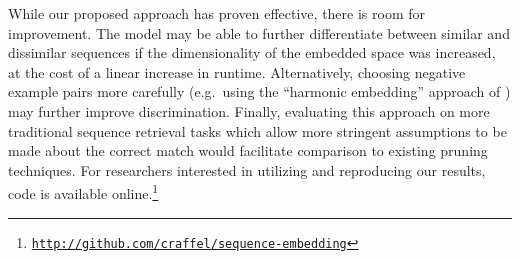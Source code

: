 \documentclass{article}
\begin{document}
While our proposed approach has proven effective, there is room for improvement.
The model may be able to further differentiate between similar and dissimilar sequences if the dimensionality of the embedded space was increased, at the cost of a linear increase in runtime.
Alternatively, choosing negative example pairs more carefully (e.g.\ using the ``harmonic embedding'' approach of \cite{schroff2015facenet}) may further improve discrimination.
Finally, evaluating this approach on more traditional sequence retrieval tasks which allow more stringent assumptions to be made about the correct match would facilitate comparison to existing pruning techniques.
For researchers interested in utilizing and reproducing our results, code is available online.\footnote{\href{http://github.com/craffel/sequence-embedding}{\texttt{http://github.com/craffel/sequence-embedding}}}



\end{document}
